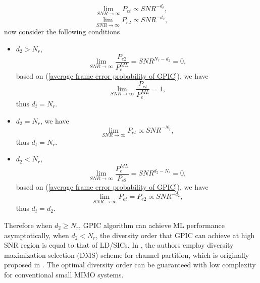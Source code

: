 \documentclass[12pt, draftclsnofoot, onecolumn]{IEEEtran}
\begin{document}
\begin{equation}
\lim_{SNR\to\infty}P_{et}\propto SNR^{-d_{t}},
\label{GPIC diversity}
\end{equation}
\begin{equation}
\lim_{SNR\to\infty}P_{e2}\propto SNR^{-d_{2}},
\label{LD diversity}
\end{equation}
 now consider the following conditions
\begin{itemize}
\item $d_{2}>N_{r}$,
\begin{equation}
\lim_{SNR\to\infty}\frac{P_{e2}}{P^{ML}_{e}}=SNR^{N_{r}-d_{2}}=0,
\label{condition1sub1}
\end{equation}
based on (\ref{average frame error probability of GPIC}), we have
\begin{equation}
\lim_{SNR\to\infty}\frac{P_{et}}{P^{ML}_{e}}=1,
\label{condition1sub2}
\end{equation}
thus $d_{t}=N_{r}$.
\item $d_2=N_{r}$,
we have 
\begin{equation}
\lim_{SNR\to\infty}P_{et}\propto SNR^{-N_{r}},
\label{condition2sub1}
\end{equation}
thus $d_{t}=N_{r}$.
\item $d_{2}<N_{r}$,
\begin{equation}
\lim_{SNR\to\infty}\frac{P^{ML}_{e}}{P_{e2}}=SNR^{d_{2}-N_{r}}=0,
\label{condition3sub1}
\end{equation}
based on (\ref{average frame error probability of GPIC}), we have  
\begin{equation}
\lim_{SNR\to\infty}P_{et}=P_{e2}\propto SNR^{-d_{2}},
\label{condition3sub2}
\end{equation}
thus 
$d_{t}=d_{2}$.
\end{itemize} 
Therefore when $d_{2}\geq N_{r}$, GPIC algorithm can achieve ML performance asymptotically, when $d_{2}<N_{r}$, the diversity order that GPIC can achieve at high SNR region is equal to that of LD/SICs. In \cite{radji2009interference}, the authors employ diversity maximization selection (DMS) scheme for channel partition, which is originally proposed in \cite{zhang2006diversity}. The optimal diversity order can be guaranteed with low complexity for conventional small MIMO systems.
\end{document}
